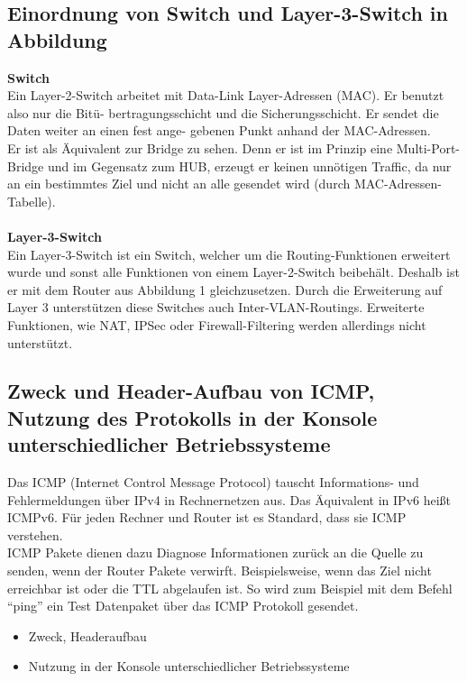 \subsection{Einordnung von Switch und Layer-3-Switch in Abbildung}

    \textbf{Switch}
    \\
    Ein Layer-2-Switch arbeitet mit Data-Link Layer-Adressen (MAC). Er benutzt also nur die Bitü- bertragungsschicht und die Sicherungsschicht. Er sendet die Daten weiter an einen fest ange- gebenen Punkt anhand der MAC-Adressen. \\
    Er ist als Äquivalent zur Bridge zu sehen. Denn er ist im Prinzip eine Multi-Port-Bridge und im Gegensatz zum HUB, erzeugt er keinen unnötigen Traffic, da nur an ein bestimmtes Ziel und nicht an alle gesendet wird (durch MAC-Adressen-Tabelle).\\
    \\
    \textbf{Layer-3-Switch}
    \\
    Ein Layer-3-Switch ist ein Switch, welcher um die Routing-Funktionen erweitert wurde und sonst alle Funktionen von einem Layer-2-Switch beibehält. Deshalb ist er mit dem Router aus Abbildung 1 gleichzusetzen. Durch die Erweiterung auf Layer 3 unterstützen diese Switches auch Inter-VLAN-Routings. Erweiterte Funktionen, wie NAT, IPSec oder Firewall-Filtering werden allerdings nicht unterstützt.



\subsection{Zweck und Header-Aufbau von ICMP, Nutzung des Protokolls in der Konsole unterschiedlicher Betriebssysteme}
    Das ICMP (Internet Control Message Protocol) tauscht Informations- und Fehlermeldungen über IPv4 in Rechnernetzen aus. Das Äquivalent in IPv6 heißt ICMPv6.
    Für jeden Rechner und Router ist es Standard, dass sie ICMP verstehen.\\
    ICMP Pakete dienen dazu Diagnose Informationen zurück an die Quelle zu senden, wenn der Router Pakete verwirft. Beispielsweise, wenn das Ziel nicht erreichbar ist oder die TTL abgelaufen ist.
    So wird zum Beispiel mit dem Befehl “ping” ein Test Datenpaket über das ICMP Protokoll gesendet.
    \begin{itemize}
        \item Zweck, Headeraufbau
        \item Nutzung in der Konsole unterschiedlicher Betriebssysteme
    \end{itemize}

